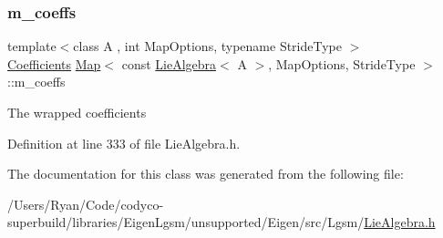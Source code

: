 \subsubsection{\texorpdfstring{m\+\_\+coeffs}{m\_coeffs}}
{\footnotesize\ttfamily template$<$class A , int Map\+Options, typename Stride\+Type $>$ \\
\hyperlink{class_map_3_01const_01_lie_algebra_3_01_a_01_4_00_01_map_options_00_01_stride_type_01_4_a3173cdb7a49ee8a41f26cb0891740634}{Coefficients} \hyperlink{class_map_3_01const_01_lie_algebra_3_01_a_01_4_00_01_map_options_00_01_stride_type_01_4_a1f3c2cd540feb372191254760225bf1a}{Map}$<$ const \hyperlink{class_lie_algebra}{Lie\+Algebra}$<$ A $>$, Map\+Options, Stride\+Type $>$\+::m\+\_\+coeffs\hspace{0.3cm}{\ttfamily [protected]}}

The wrapped coefficients 

Definition at line 333 of file Lie\+Algebra.\+h.



The documentation for this class was generated from the following file\+:\begin{DoxyCompactItemize}
\item 
/\+Users/\+Ryan/\+Code/codyco-\/superbuild/libraries/\+Eigen\+Lgsm/unsupported/\+Eigen/src/\+Lgsm/\hyperlink{_lie_algebra_8h}{Lie\+Algebra.\+h}\end{DoxyCompactItemize}
